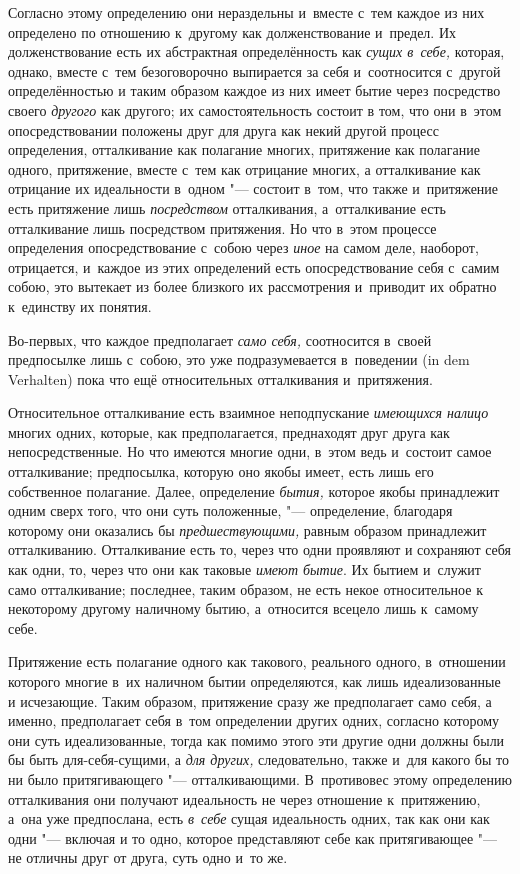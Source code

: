 Согласно этому определению они нераздельны и~вместе с~тем каждое из них
определено по отношению к~другому как долженствование и~предел. Их
долженствование есть их абстрактная определённость как
{\em сущих в~себе,} которая, однако, вместе с~тем
безоговорочно выпирается за себя и~соотносится с~другой определённостью и
таким образом каждое из них имеет бытие через посредство своего
{\em другого} как другого; их самостоятельность состоит
в том, что они в~этом опосредствовании положены друг для друга как некий
другой процесс определения, отталкивание как полагание многих, притяжение
как полагание одного, притяжение, вместе с~тем как отрицание многих, а
отталкивание как отрицание их идеальности в~одном "--- состоит в~том, что
также и~притяжение есть притяжение лишь
{\em посредством} отталкивания, а~отталкивание есть
отталкивание лишь посредством притяжения. Но что в~этом процессе
определения опосредствование с~собою через {\em иное}
на самом деле, наоборот, отрицается, и~каждое из этих определений есть
опосредствование себя с~самим собою, это вытекает из более близкого их
рассмотрения и~приводит их обратно к~единству их понятия.

Во-первых, что каждое предполагает {\em само себя,} соотносится в~своей
предпосылке лишь с~собою, это уже подразумевается в~поведении
(in dem Verhalten) пока что ещё относительных отталкивания и~притяжения.

Относительное отталкивание есть взаимное неподпускание
{\em имеющихся налицо} многих одних, которые, как
предполагается, преднаходят друг друга как непосредственные. Но что имеются
многие одни, в~этом ведь и~состоит самое отталкивание; предпосылка, которую
оно якобы имеет, есть лишь его собственное полагание. Далее, определение
{\em бытия,} которое якобы принадлежит одним сверх
того, что они суть положенные, "--- определение, благодаря которому они
оказались бы {\em предшествующими,} равным образом
принадлежит отталкиванию. Отталкивание есть то, через что одни проявляют и
сохраняют себя как одни, то, через что они как таковые
{\em имеют бытие}. Их бытием и~служит само
отталкивание; последнее, таким образом, не есть некое относительное к
некоторому другому наличному бытию, а~относится всецело лишь к~самому себе.

Притяжение есть полагание одного как такового, реального одного, в~отношении
которого многие в~их наличном бытии определяются, как лишь идеализованные и
исчезающие. Таким образом, притяжение сразу же предполагает само себя, а
именно, предполагает себя в~том определении других одних, согласно которому
они суть идеализованные, тогда как помимо этого эти другие одни должны были
бы быть для-себя-сущими, а {\em для других,}
следовательно, также и~для какого бы то ни было притягивающего
"--- отталкивающими. В~противовес этому определению отталкивания они получают
идеальность не через отношение к~притяжению, а~она уже предпослана, есть
{\em в~себе} сущая идеальность одних, так как они как одни "--- включая
и то одно, которое представляют себе как притягивающее "--- не
отличны друг от друга, суть одно и~то же.

